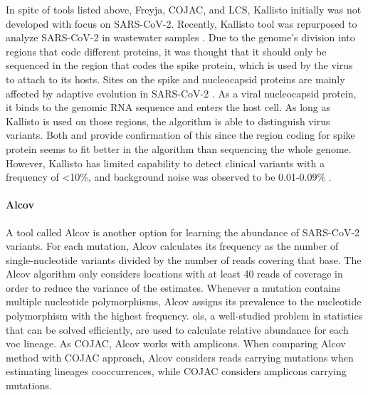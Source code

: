         In spite of tools listed above, Freyja, COJAC, and LCS, Kallisto initially was not developed with focus on SARS-CoV-2. Recently, Kallisto tool was repurposed to analyze SARS-CoV-2 in wastewater samples \cite{baaijens2021,kallisto2022}. Due to the genome's division into regions that code different proteins, it was thought that it should only be sequenced in the region that codes the spike protein, which is used by the virus to attach to its hosts. Sites on the spike and nucleocapsid proteins are mainly affected by adaptive evolution in SARS-CoV-2 \cite{rochman2021}. As a viral nucleocapsid protein, it binds to the genomic RNA sequence and enters the host cell. As long as Kallisto is used on those regions, the algorithm is able to distinguish virus variants. Both \cite{baaijens2021} and \cite{anton2022} provide confirmation of this since the region coding for spike protein seems to fit better in the algorithm than sequencing the whole genome. However, Kallisto has limited capability to detect clinical variants with a frequency of <10\%, and background noise was observed to be 0.01-0.09\% \cite{baaijens2021}.
        \paragraph{Alcov}
        A tool called Alcov \cite{ellmen2021} is another option for learning the abundance of SARS-CoV-2 variants. For each mutation, Alcov calculates its frequency as the number of single-nucleotide variants divided by the number of reads covering that base. The Alcov algorithm only considers locations with at least 40 reads of coverage in order to reduce the variance of the estimates. Whenever a mutation contains multiple nucleotide polymorphisms, Alcov assigns its prevalence to the nucleotide polymorphism with the highest frequency. \acrfull{ols}, a well-studied problem in statistics that can be solved efficiently, are used to calculate relative abundance for each \acrfull{voc} lineage. As COJAC, Alcov works with amplicons. When comparing Alcov method with COJAC approach, Alcov considers reads carrying mutations when estimating lineages cooccurrences, while COJAC considers amplicons carrying mutations.
